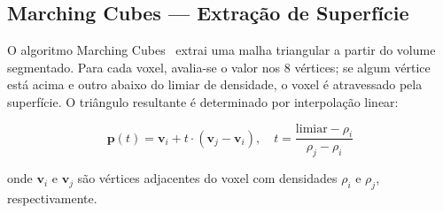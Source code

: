 \subsection{Marching Cubes — Extração de Superfície}
\label{subsec:marching-cubes}

O algoritmo Marching Cubes~\cite{lorensen1987marching} extrai uma malha triangular a partir do volume segmentado. Para cada voxel, avalia-se o valor nos 8 vértices; se algum vértice está acima e outro abaixo do limiar de densidade, o voxel é atravessado pela superfície. O triângulo resultante é determinado por interpolação linear:

\begin{equation}
\label{eq:marching-cubes}
\mathbf{p}(t) = \mathbf{v}_i + t \cdot (\mathbf{v}_j - \mathbf{v}_i), \quad t = \frac{\text{limiar} - \rho_i}{\rho_j - \rho_i}
\end{equation}

onde $\mathbf{v}_i$ e $\mathbf{v}_j$ são vértices adjacentes do voxel com densidades $\rho_i$ e $\rho_j$, respectivamente.

